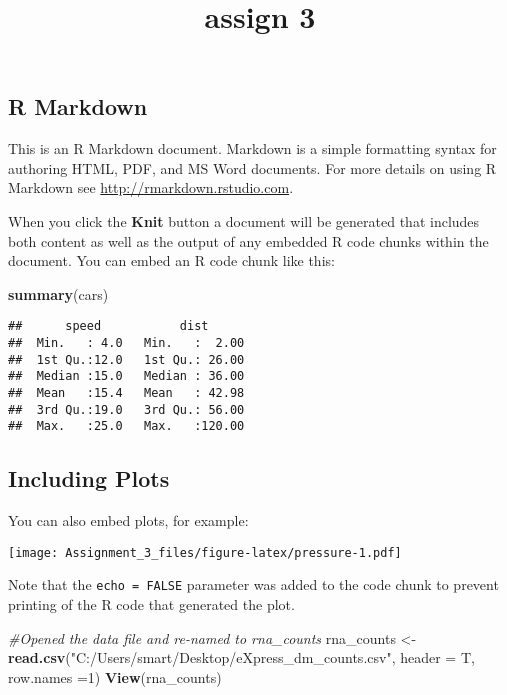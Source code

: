 \documentclass[]{article}
\title{assign 3}
\author{}
\date{}
\newenvironment{Shaded}{\begin{snugshade}}{\end{snugshade}}
\newcommand{\KeywordTok}[1]{\textcolor[rgb]{0.13,0.29,0.53}{\textbf{#1}}}
\newcommand{\DataTypeTok}[1]{\textcolor[rgb]{0.13,0.29,0.53}{#1}}
\newcommand{\DecValTok}[1]{\textcolor[rgb]{0.00,0.00,0.81}{#1}}
\newcommand{\StringTok}[1]{\textcolor[rgb]{0.31,0.60,0.02}{#1}}
\newcommand{\CommentTok}[1]{\textcolor[rgb]{0.56,0.35,0.01}{\textit{#1}}}
\newcommand{\NormalTok}[1]{#1}
\begin{document}
\maketitle

\subsection{R Markdown}\label{r-markdown}

This is an R Markdown document. Markdown is a simple formatting syntax
for authoring HTML, PDF, and MS Word documents. For more details on
using R Markdown see \url{http://rmarkdown.rstudio.com}.

When you click the \textbf{Knit} button a document will be generated
that includes both content as well as the output of any embedded R code
chunks within the document. You can embed an R code chunk like this:

\begin{Shaded}
\begin{Highlighting}[]
\KeywordTok{summary}\NormalTok{(cars)}
\end{Highlighting}
\end{Shaded}

\begin{verbatim}
##      speed           dist       
##  Min.   : 4.0   Min.   :  2.00  
##  1st Qu.:12.0   1st Qu.: 26.00  
##  Median :15.0   Median : 36.00  
##  Mean   :15.4   Mean   : 42.98  
##  3rd Qu.:19.0   3rd Qu.: 56.00  
##  Max.   :25.0   Max.   :120.00
\end{verbatim}

\subsection{Including Plots}\label{including-plots}

You can also embed plots, for example:

\texttt{[image: Assignment\_3\_files/figure-latex/pressure-1.pdf]}

Note that the \texttt{echo\ =\ FALSE} parameter was added to the code
chunk to prevent printing of the R code that generated the plot.

\begin{Shaded}
\begin{Highlighting}[]
\CommentTok{#Opened the data file and re-named to rna_counts}
\NormalTok{rna_counts <-}\StringTok{ }\KeywordTok{read.csv}\NormalTok{(}\StringTok{"C:/Users/smart/Desktop/eXpress_dm_counts.csv"}\NormalTok{, }\DataTypeTok{header =}\NormalTok{ T, }\DataTypeTok{row.names =}\DecValTok{1}\NormalTok{)}
\KeywordTok{View}\NormalTok{(rna_counts)}
\end{Highlighting}
\end{Shaded}
\end{document}
